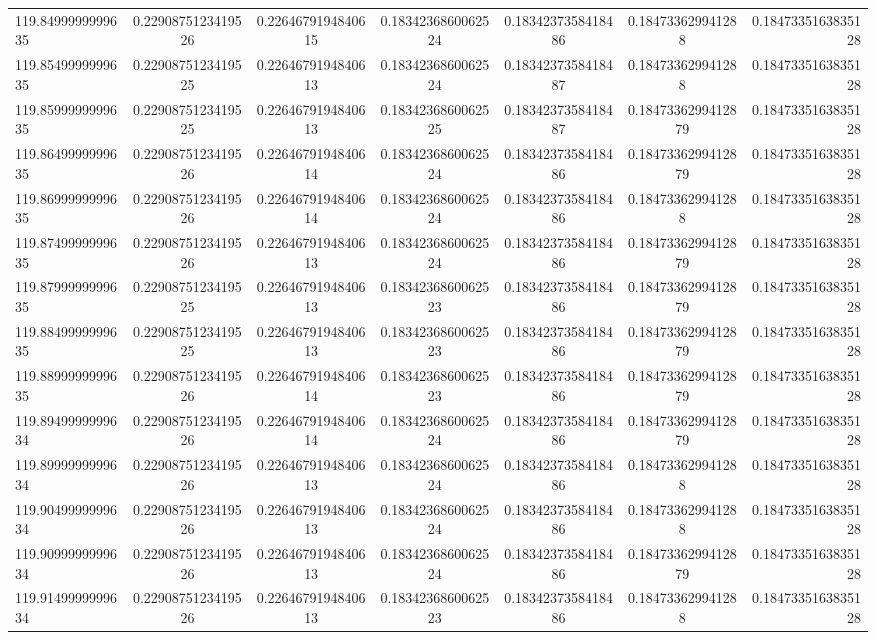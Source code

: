 \begin{tabular}{ l | c | c | c | c | c | r }
119.8499999999635  & 0.2290875123419526  & 0.2264679194840615  & 0.1834236860062524  & 0.1834237358418486  & 0.184733629941288  & 0.1847335163835128 \\
119.8549999999635  & 0.2290875123419525  & 0.2264679194840613  & 0.1834236860062524  & 0.1834237358418487  & 0.184733629941288  & 0.1847335163835128 \\
119.8599999999635  & 0.2290875123419525  & 0.2264679194840613  & 0.1834236860062525  & 0.1834237358418487  & 0.1847336299412879  & 0.1847335163835128 \\
119.8649999999635  & 0.2290875123419526  & 0.2264679194840614  & 0.1834236860062524  & 0.1834237358418486  & 0.1847336299412879  & 0.1847335163835128 \\
119.8699999999635  & 0.2290875123419526  & 0.2264679194840614  & 0.1834236860062524  & 0.1834237358418486  & 0.184733629941288  & 0.1847335163835128 \\
119.8749999999635  & 0.2290875123419526  & 0.2264679194840613  & 0.1834236860062524  & 0.1834237358418486  & 0.1847336299412879  & 0.1847335163835128 \\
119.8799999999635  & 0.2290875123419525  & 0.2264679194840613  & 0.1834236860062523  & 0.1834237358418486  & 0.1847336299412879  & 0.1847335163835128 \\
119.8849999999635  & 0.2290875123419525  & 0.2264679194840613  & 0.1834236860062523  & 0.1834237358418486  & 0.1847336299412879  & 0.1847335163835128 \\
119.8899999999635  & 0.2290875123419526  & 0.2264679194840614  & 0.1834236860062523  & 0.1834237358418486  & 0.1847336299412879  & 0.1847335163835128 \\
119.8949999999634  & 0.2290875123419526  & 0.2264679194840614  & 0.1834236860062524  & 0.1834237358418486  & 0.1847336299412879  & 0.1847335163835128 \\
119.8999999999634  & 0.2290875123419526  & 0.2264679194840613  & 0.1834236860062524  & 0.1834237358418486  & 0.184733629941288  & 0.1847335163835128 \\
119.9049999999634  & 0.2290875123419526  & 0.2264679194840613  & 0.1834236860062524  & 0.1834237358418486  & 0.184733629941288  & 0.1847335163835128 \\
119.9099999999634  & 0.2290875123419526  & 0.2264679194840613  & 0.1834236860062524  & 0.1834237358418486  & 0.1847336299412879  & 0.1847335163835128 \\
119.9149999999634  & 0.2290875123419526  & 0.2264679194840613  & 0.1834236860062523  & 0.1834237358418486  & 0.184733629941288  & 0.1847335163835128 \\

\end{tabular}
